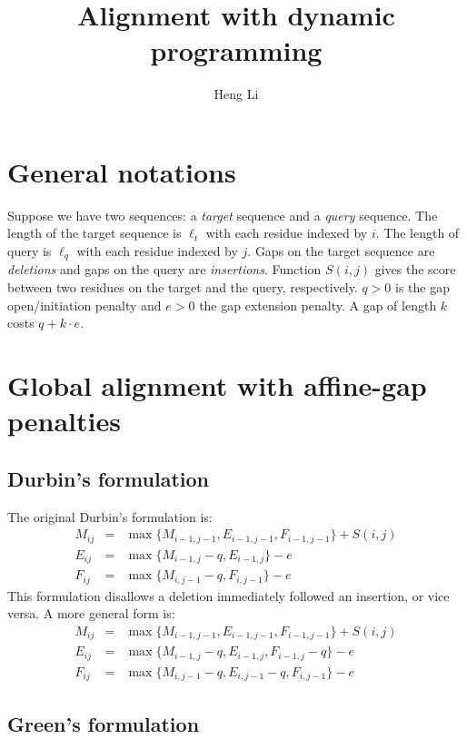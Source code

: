\documentclass[10pt]{article}
\title{Alignment with dynamic programming}
\author{Heng Li}
\begin{document}
\maketitle

\section{General notations}

Suppose we have two sequences: a \emph{target} sequence and a \emph{query}
sequence. The length of the target sequence is $\ell_t$ with each residue
indexed by $i$.  The length of query is $\ell_q$ with each residue indexed by
$j$. Gaps on the target sequence are \emph{deletions} and gaps on the query are
\emph{insertions}. Function $S(i,j)$ gives the score between two residues on
the target and the query, respectively. $q>0$ is the gap open/initiation
penalty and $e>0$ the gap extension penalty. A gap of length $k$ costs
$q+k\cdot e$.

\section{Global alignment with affine-gap penalties}

\subsection{Durbin's formulation}

The original Durbin's formulation is:
\begin{eqnarray*}
M_{ij}&=&\max\{M_{i-1,j-1}, E_{i-1,j-1}, F_{i-1,j-1}\} + S(i,j)\\
E_{ij}&=&\max\{M_{i-1,j}-q, E_{i-1,j}\} - e\\
F_{ij}&=&\max\{M_{i,j-1}-q, F_{i,j-1}\} - e
\end{eqnarray*}
This formulation disallows a deletion immediately followed an insertion, or
vice versa. A more general form is:
\begin{eqnarray*}
M_{ij}&=&\max\{M_{i-1,j-1}, E_{i-1,j-1}, F_{i-1,j-1}\} + S(i,j)\\
E_{ij}&=&\max\{M_{i-1,j}-q, E_{i-1,j}, F_{i-1,j}-q\} - e\\
F_{ij}&=&\max\{M_{i,j-1}-q, E_{i,j-1}-q, F_{i,j-1}\} - e
\end{eqnarray*}

\subsection{Green's formulation}
\end{document}
